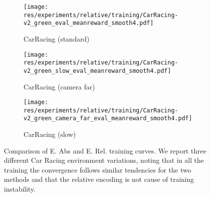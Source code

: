 \begin{figure}[t!]
    \centering
    \begin{subfigure}[b]{0.3\textwidth} %
        \centering
        \texttt{[image: res/experiments/relative/training/CarRacing-v2\_green\_eval\_meanreward\_smooth4.pdf]}
        \caption{CarRacing (standard)}
        \label{subfig:training-carracing-standard}
    \end{subfigure}
    \hspace{1mm}
    \begin{subfigure}[b]{0.3\textwidth} %
        \centering
        \texttt{[image: res/experiments/relative/training/CarRacing-v2\_green\_slow\_eval\_meanreward\_smooth4.pdf]}
        \caption{CarRacing (camera far)}
        \label{subfig:training-carracing-camera_far}
    \end{subfigure}
    \begin{subfigure}[b]{0.3\textwidth} %
        \centering
        \texttt{[image: res/experiments/relative/training/CarRacing-v2\_green\_camera\_far\_eval\_meanreward\_smooth4.pdf]}
        \caption{CarRacing (slow)}
        \label{subfig:training-carracing-slow}
    \end{subfigure}
    \caption{Comparison of E. Abs and E. Rel. training curves. We report three different Car Racing environment variations, noting that in all the training the convergence follows similar tendencies for the two methods and that the relative encoding is not cause of training instability.}
    \label{fig:rel-carracing-training_comparison}
\end{figure}

